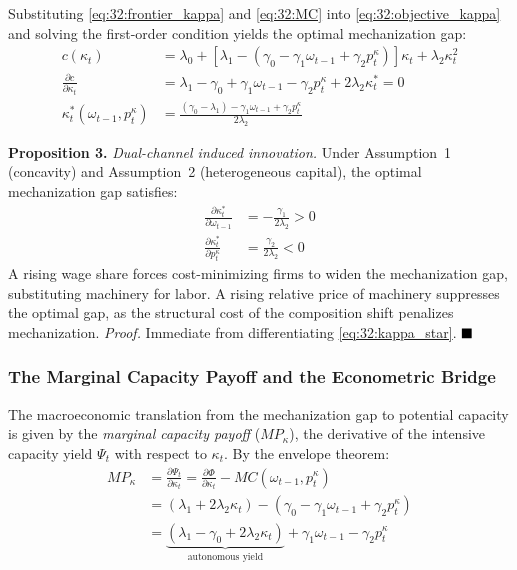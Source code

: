 Substituting \eqref{eq:32:frontier_kappa} and
\eqref{eq:32:MC} into \eqref{eq:32:objective_kappa} and
solving the first-order condition yields the optimal
mechanization gap:
\begin{align}
	c(\kappa_t) &= \lambda_0
	+ \left[\lambda_1 - (\gamma_0 - \gamma_1 \omega_{t-1}
	+ \gamma_2 p^\kappa_t)\right] \kappa_t
	+ \lambda_2 \kappa_t^2
	\label{eq:32:unconstrained_kappa} \\
	\frac{\partial c}{\partial \kappa_t} &= \lambda_1 - \gamma_0
	+ \gamma_1 \omega_{t-1} - \gamma_2 p^\kappa_t
	+ 2\lambda_2 \kappa_t^* = 0
	\label{eq:32:foc_kappa} \\
	\kappa_t^*(\omega_{t-1}, p^\kappa_t)
	&= \frac{(\gamma_0 - \lambda_1) - \gamma_1 \omega_{t-1}
		+ \gamma_2 p^\kappa_t}{2\lambda_2}
	\label{eq:32:kappa_star}
\end{align}

\textbf{Proposition 3.} \textit{Dual-channel induced
	innovation.} Under Assumption~1 (concavity) and
Assumption~2 (heterogeneous capital), the optimal
mechanization gap satisfies:
\begin{align}
	\frac{\partial \kappa_t^*}{\partial \omega_{t-1}}
	&= -\frac{\gamma_1}{2\lambda_2} > 0
	\label{eq:32:cs_omega} \\
	\frac{\partial \kappa_t^*}{\partial p^\kappa_t}
	&= \frac{\gamma_2}{2\lambda_2} < 0
	\label{eq:32:cs_price}
\end{align}
A rising wage share forces cost-minimizing firms to widen
the mechanization gap, substituting machinery for labor.
A rising relative price of machinery suppresses the optimal
gap, as the structural cost of the composition shift
penalizes mechanization. \textit{Proof.} Immediate from
differentiating \eqref{eq:32:kappa_star}. $\hfill\blacksquare$

\subsubsection{The Marginal Capacity Payoff and the
	Econometric Bridge}

The macroeconomic translation from the mechanization gap to
potential capacity is given by the \textit{marginal capacity payoff} ($MP_\kappa$), the derivative of the
intensive capacity yield $\Psi_t$ with respect to $\kappa_t$.
By the envelope theorem:
\begin{align}
	MP_\kappa &= \frac{\partial \Psi_t}{\partial \kappa_t}
	= \frac{\partial \Phi}{\partial \kappa_t}
	- MC(\omega_{t-1}, p^\kappa_t)
	\label{eq:32:MP_env} \\
	&= (\lambda_1 + 2\lambda_2 \kappa_t)
	- (\gamma_0 - \gamma_1 \omega_{t-1} + \gamma_2 p^\kappa_t)
	\label{eq:32:MP_expanded} \\
	&= \underbrace{(\lambda_1 - \gamma_0
		+ 2\lambda_2 \kappa_t)}_{\text{autonomous yield}}
	+ \gamma_1 \omega_{t-1} - \gamma_2 p^\kappa_t
	\label{eq:32:MP_rearranged}
\end{align}

